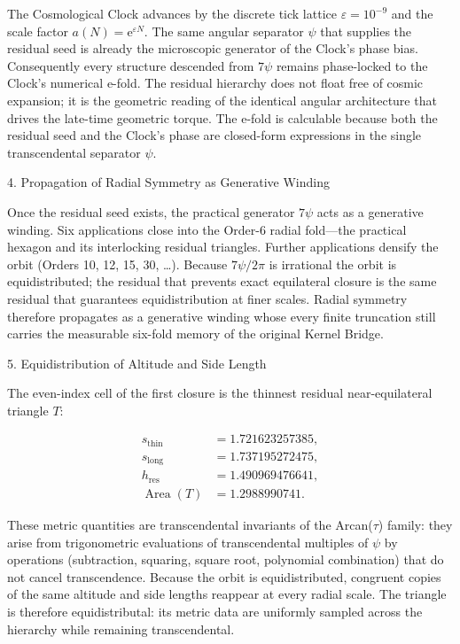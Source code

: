 The Cosmological Clock advances by the discrete tick lattice \(\varepsilon=10^{-9}\) and the scale factor \(a(N)=\mathrm{e}^{\varepsilon N}\). The same angular separator \(\psi\) that supplies the residual seed is already the microscopic generator of the Clock’s phase bias. Consequently every structure descended from \(7\psi\) remains phase-locked to the Clock’s numerical e-fold. The residual hierarchy does not float free of cosmic expansion; it is the geometric reading of the identical angular architecture that drives the late-time geometric torque. The e-fold is calculable because both the residual seed and the Clock’s phase are closed-form expressions in the single transcendental separator \(\psi\).

4. Propagation of Radial Symmetry as Generative Winding

Once the residual seed exists, the practical generator \(7\psi\) acts as a generative winding. Six applications close into the Order-6 radial fold—the practical hexagon and its interlocking residual triangles. Further applications densify the orbit (Orders 10, 12, 15, 30, \ldots). Because \(7\psi/2\pi\) is irrational the orbit is equidistributed; the residual that prevents exact equilateral closure is the same residual that guarantees equidistribution at finer scales. Radial symmetry therefore propagates as a generative winding whose every finite truncation still carries the measurable six-fold memory of the original Kernel Bridge.

5. Equidistribution of Altitude and Side Length

The even-index cell of the first closure is the thinnest residual near-equilateral triangle \(T\):

\[
\begin{align*}
s_{\mathrm{thin}}&=1.721623257385,\\
s_{\mathrm{long}}&=1.737195272475,\\
h_{\mathrm{res}}&=1.490969476641,\\
\operatorname{Area}(T)&=1.2988990741.
\end{align*}
\]

These metric quantities are transcendental invariants of the Arcan(\(\tau\)) family: they arise from trigonometric evaluations of transcendental multiples of \(\psi\) by operations (subtraction, squaring, square root, polynomial combination) that do not cancel transcendence. Because the orbit is equidistributed, congruent copies of the same altitude and side lengths reappear at every radial scale. The triangle is therefore equidistributal: its metric data are uniformly sampled across the hierarchy while remaining transcendental.

